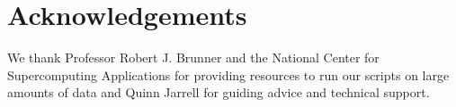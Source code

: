 \documentclass[9pt,twocolumn,twoside]{idsi}
\begin{document}
\section{Acknowledgements}
We thank Professor Robert J. Brunner and the National Center for Supercomputing Applications for providing resources to run our scripts on large amounts of data and Quinn Jarrell for guiding advice and technical support. 















\end{document}
